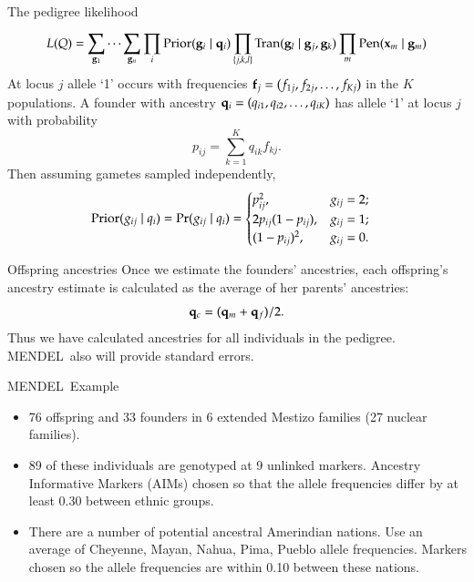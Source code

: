 \documentclass[serif,professionalfonts,svgnames]{beamer}
\newcommand{\mendel}{\textsc{MENDEL}}
\def\Pr{\mathop{\rm Pr\,\!}\nolimits}
\begin{document}
\begin{frame}{The pedigree likelihood}

  {\small
  $$L(Q) = \sum_{{\bf g}_1} \cdots \sum_{{\bf g}_n} 
    \prod_i \mathrm{Prior}({\bf g}_i \mid {\bf q}_i) 
    \prod_{\{j,k,l\}} \mathrm{Tran}({\bf g}_l \mid {\bf g}_j, {\bf g}_k) 
    \prod_m \mathrm{Pen}({\bf x}_m \mid {\bf g}_m) $$ }
  At locus $j$ allele `1' occurs with
  frequencies ${\bf f}_j = (f_{1j}, f_{2j}, \ldots, f_{Kj})$ in the $K$
  populations. A founder with ancestry ${\bf q}_i = (q_{i1}, q_{i2}, \ldots,
  q_{iK})$ has allele `1' at locus $j$ with probability 
  $$p_{ij}=\sum_{k=1}^Kq_{ik} f_{kj}.$$
   Then assuming gametes sampled independently,
  \begin{align*}
    \mathrm{Prior}(g_{ij} \mid q_i)  &= \Pr(g_{ij} \mid q_i)   
                                      =\begin{cases}
                                        p_{ij}^2,            & g_{ij}=2; \\
                                        2 p_{ij}(1-p_{ij}),  & g_{ij}=1; \\
                                        (1-p_{ij})^2,        & g_{ij}=0. 
                                      \end{cases}
  \end{align*}

\end{frame}



\begin{frame}{Offspring ancestries}
  Once we estimate the founders' ancestries, each offspring's ancestry
  estimate is calculated as the average of her parents' ancestries:
 $${\bf q}_c = ({\bf q}_m + {\bf q}_f)/2.$$
 Thus we have calculated ancestries for all individuals in the pedigree.  \mendel\ also will provide standard errors.  \end{frame}



\begin{frame}{\mendel\ Example}
  \begin{itemize}
  \item 76 offspring and 33 founders in 6 extended Mestizo 
  families (27 nuclear families). 
  
  \item   89 of these individuals are genotyped at 9 unlinked 
    markers. Ancestry Informative Markers (AIMs) chosen so that
    the allele frequencies differ by at least 0.30 between
    ethnic groups.
  
  \item There are a number of potential ancestral Amerindian 
    nations. Use an average of Cheyenne, Mayan,
    Nahua, Pima, Pueblo allele frequencies. Markers
    chosen so the allele frequencies are within 0.10
    between these nations.
  \end{itemize}
\end{frame}
\end{document}
